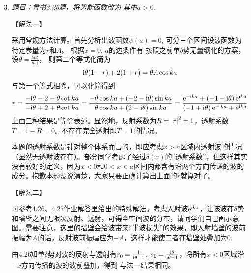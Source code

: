 \begin{enumerate}[label=\textbf{4.\Alph*}, listparindent=\parindent, leftmargin=-0.5mm]
\setcounter{enumi}{2}
\item \emph{题目：曾书3.26题，将势能函数改为
其中$a>0$.}

\noindent【解法一】

采用常规方法计算。首先分析出波函数$\psi(a)=0$, 可分三个区间设波函数为
待定参量为$r$和$A$。
根据$x=0,\,a$的边条件有
按照之前单$\delta$势无量纲化的方案，设$\theta = \frac{k\hbar^2}{m\gamma}$，
则第二个等式化简为
\[\mathrm{i}\theta (1-r)+2(1+r)=\theta A\cos ka\]
与第一个等式相除，可以化简得到
\[r = \frac{-\mathrm{i}\theta-2-\theta\cot ka}{-\mathrm{i}\theta+2+\theta\cot ka}
= \frac{-\theta \cos ka + (-2-\mathrm{i}\theta)\sin ka}{\theta \cos ka + (2-\mathrm{i}\theta)\sin ka}
= \frac{\mathrm{e}^{-\mathrm{i} ka}+(-1-\mathrm{i}\theta)\,\mathrm{e}^{\mathrm{i} ka}}{(-1+\mathrm{i}\theta)\,\mathrm{e}^{-\mathrm{i} ka}+\mathrm{e}^{\mathrm{i} ka}}\]
上面三种结果是等价表述。显然地，反射系数为$R=\abs{r}^2=1$，透射系数$T=1-R=0$。不存在完全透射即$T=1$的情况。

本题的透射系数是针对整个体系而言的，即应考虑$x>a$区域内透射波的情况（显然无透射波存在）。部分同学考虑了经过$\delta(x)$的“透射系数”，但这样其实没有较好的定义，因为$x<0$和$0<x<a$区间内都含有沿两个方向传递的波的成分。抱歉本题没说清楚，大家只要正确计算出上面的$r$就算对了。

\noindent【解法二】

可参考4.26、4.27作业解答里给出的特殊解法。考虑入射波$\mathrm{e}^{\mathrm{i} kx}$，让该波在$\delta$势和墙壁之间无限次反射、透射，可得全空间波的分布，请同学们自己画示意图。需要注意，这里的墙壁会给波带来“半波损失”的效果，即入射墙壁的波前振幅为$\tilde{A}$的话，反射波前振幅应为$-\tilde{A}$，这样才能使二者在墙壁处叠加为0.

由4.26知单$\delta$势对波的反射与透射有$r_0=\frac{1}{\mathrm{i}\theta-1}$, $s_0=\frac{\mathrm{i}\theta}{\mathrm{i}\theta-1}$，将所有$x<0$区域沿$-x$方向传播的波的波前叠加，得到
与法一结果相同。
\end{enumerate}

